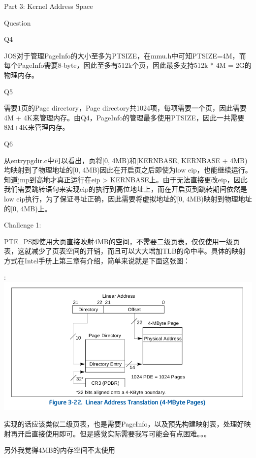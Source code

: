 \documentclass[GBK,winfonts,a4paper,10pt]{ctexart}
\begin{document}
\begin{section}{Part 3: Kernel Address Space}
\begin{subsection}{Question}
\begin{subsubsection}{Q4}
\par
JOS对于管理PageInfo的大小至多为PTSIZE，在mmu.h中可知PTSIZE=4M，而每个PageInfo需要8-byte，因此至多有512k个页，因此最多支持512k * 4M = 2G的物理内存。
\end{subsubsection}

\begin{subsubsection}{Q5}
\par
需要1页的Page directory，Page directory共1024项，每项需要一个页，因此需要4M + 4K来管理内存。由Q4，PageInfo的管理最多使用PTSIZE，因此一共需要8M+4K来管理内存。
\end{subsubsection}

\begin{subsubsection}{Q6}
\par
从entrypgdir.c中可以看出，页将[0, 4MB)和[KERNBASE, KERNBASE + 4MB)均映射到了物理地址的[0, 4MB)因此在开启页之后即使为low eip，也能继续运行。知道jmp到高地才真正运行在eip > KERNBASE上。由于无法直接更改eip，因此我们需要跳转语句来实现eip的执行到高位地址上，而在开启页到跳转期间依然是low eip执行，为了保证寻址正确，因此需要将虚拟地址的[0, 4MB)映射到物理地址的[0, 4MB)上。
\end{subsubsection}


\end{subsection}

\begin{subsection}{Challenge 1:}
\par
PTE\_PS即使用大页直接映射4MB的空间，不需要二级页表，仅仅使用一级页表，这就减少了页表空间的开销，而且可以大大增加TLB的命中率。具体的映射方式在Intel手册上第三章有介绍，简单来说就是下面这张图：
\par:
\includegraphics[scale=0.5]{4Mpage.png}
\par
实现的话应该类似二级页表，也是需要PageInfo，以及预先构建映射表，处理好映射再开启直接使用即可。但是感觉实际需要我写可能会有点困难。。。
\par
另外我觉得4MB的内存空间不太使用
\end{subsection}


\end{section}
\end{document}
